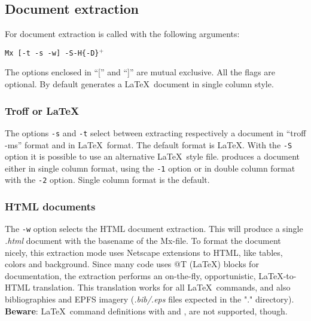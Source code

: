 \documentclass{article}
\begin{document}

\subsection{Document extraction}

For document extraction \Mx is called with the following arguments:

\noindent
\begin{center}
	{\tt Mx [-t -s -w] -S\file [-1 -2] -H\n  \{-D\macro\}$^+$\mxfile}
\end{center}

The options enclosed in ``['' and ``]'' are mutual exclusive. 
All the flags are optional. By default \Mx generates a \LaTeX\
document in single column style.

\subsubsection{Troff or \LaTeX}
The options {\tt -s} and {\tt -t} select between extracting 
respectively a document in ``troff -ms'' format and in \LaTeX\ format.
The default format is \LaTeX. With the {\tt -S\file} option
it is possible to use an alternative \LaTeX\ style file. 
\Mx produces a document either in single column format, using the
{\tt -1} option or in double column format with the {\tt -2} option.
Single column format is the default.

\subsubsection{HTML documents}
The {\tt -w} option selects the HTML document extraction. This will
produce a single {\em .html} document with the basename of the Mx-file. To
format the document nicely, this extraction mode uses Netscape extensions
to HTML, like tables, colors and background.  Since many code uses @T 
(\LaTeX) blocks for documentation, the extraction performs an on-the-fly,
opportunistic, \LaTeX-to-HTML translation. This translation
works for all \LaTeX\ commands, and also bibliographies and EPFS imagery
({\em .bib/.eps} files expected in the "." directory). {\bf Beware}:
\LaTeX\ command definitions with \Lc{def} and
, are not supported, though.
\end{document}
